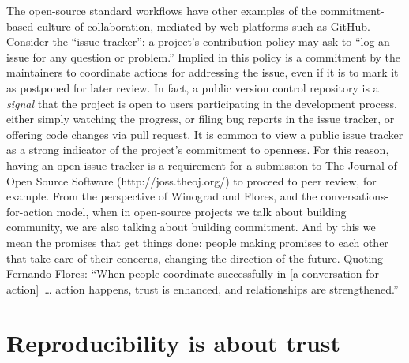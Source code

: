 \documentclass{statement}
\newlength{\up}
\begin{document}
The open-source standard workflows have other examples of the commitment-based culture of collaboration, mediated by web platforms such as GitHub. 
Consider the ``issue tracker'': a project's contribution policy may ask to ``log an issue for any question or problem.'' 
Implied in this policy is a commitment by the maintainers to coordinate actions for addressing the issue, even if it is to mark it as postponed for later review. 
In fact, a public version control repository is a \emph{signal} that the project is open to users participating in the development process, either simply watching the progress, or filing bug reports in the issue tracker, or offering code changes via pull request. 
It is common to view a public issue tracker as a strong indicator of the project's commitment to openness. 
For this reason, having an open issue tracker is a requirement for a submission to The Journal of Open Source Software (http://joss.theoj.org/) to proceed to peer review, for example. 
From the perspective of Winograd and Flores, and the conversations-for-action model, when in open-source projects we talk about building community, we are also talking about building commitment. 
And by this we mean the promises that get things done: people making promises to each other that take care of their concerns, changing the direction of the future. 
Quoting Fernando Flores: ``When people coordinate successfully in [a conversation for action] … action happens, trust is enhanced, and relationships are strengthened.''

\section*{Reproducibility is about trust}
\vspace{\up}
\end{document}
